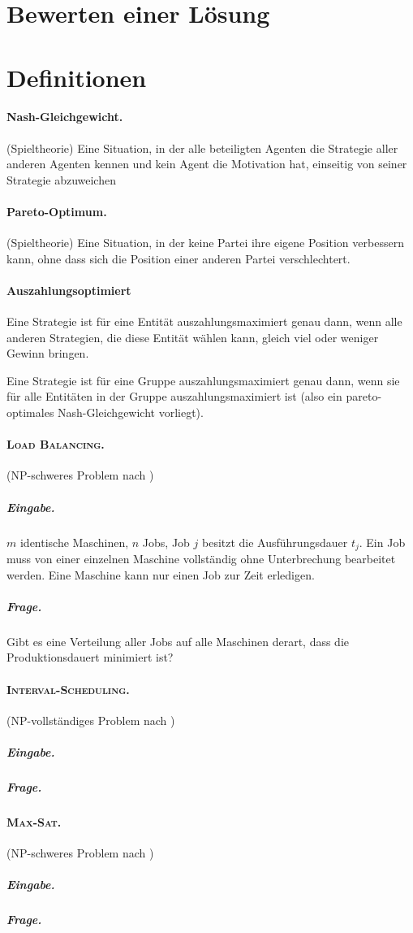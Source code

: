 \documentclass[12pt,twoside]{article}
\theoremstyle{plain}
\theoremstyle{definition}
\theoremstyle{remark}
\newcommand{\ints}{\textsc{Interval-Scheduling}}
\newcommand{\msat}{\textsc{Max-Sat}}
\newcommand{\lb}{\textsc{Load Balancing}}
\begin{document}
\section{Bewerten einer Lösung}
\label{sec:eval}
\lipsum[40-50]
\lipsum[9999]

\newpage
{}
\section*{Definitionen}
\paragraph*{Nash-Gleichgewicht.}
	\label{def:st:nash}
	(Spieltheorie) Eine Situation, in der alle beteiligten Agenten die Strategie aller anderen Agenten kennen und kein Agent die Motivation hat, einseitig von seiner Strategie abzuweichen
\paragraph*{Pareto-Optimum.}
	\label{def:st:pareto}
	(Spieltheorie) Eine Situation, in der keine Partei ihre eigene Position verbessern kann, ohne dass sich die Position einer anderen Partei verschlechtert.
\paragraph*{Auszahlungsoptimiert}
	\label{def:st:auszahlung}
	Eine Strategie ist für eine Entität auszahlungsmaximiert genau dann, wenn alle anderen Strategien, die diese Entität wählen kann, gleich viel oder weniger Gewinn bringen.
	
	Eine Strategie ist für eine Gruppe auszahlungsmaximiert genau dann, wenn sie für alle Entitäten in der Gruppe auszahlungsmaximiert ist (also ein pareto-optimales Nash-Gleichgewicht vorliegt).
\paragraph*{\lb .}
	\label{def:prob:load-balancing}
	(NP-schweres Problem nach \cite{Andreae2016})
		\subparagraph*{Eingabe.}$m$ identische Maschinen, $n$ Jobs, Job $j$ besitzt die Ausführungsdauer $t_j$.
		Ein Job muss von einer einzelnen Maschine vollständig ohne Unterbrechung bearbeitet werden.
		Eine Maschine kann nur einen Job zur Zeit erledigen.
		\subparagraph*{Frage.} Gibt es eine Verteilung aller Jobs auf alle Maschinen derart, dass die Produktionsdauert minimiert ist?
\paragraph*{\ints .}
	\label{def:prob:interval-scheduling}
	(NP-vollständiges Problem nach \cite{Andreae2016})
		\subparagraph*{Eingabe.}
		\subparagraph*{Frage.}
\paragraph*{\msat .}
	\label{def:prob:max-sat}
	(NP-schweres Problem nach \cite{Andreae2016})
		\subparagraph*{Eingabe.}
		\subparagraph*{Frage.}


\nocite{*}
\end{document}
